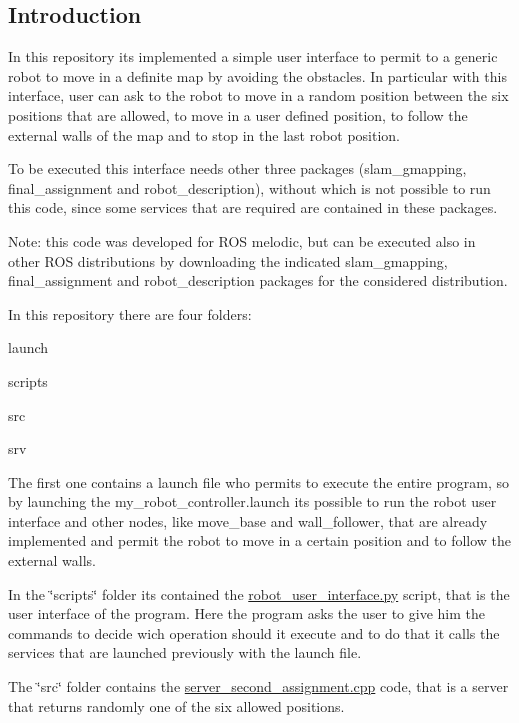 \subsection*{Introduction}

In this repository it\textquotesingle{}s implemented a simple user interface to permit to a generic robot to move in a definite map by avoiding the obstacles. In particular with this interface, user can ask to the robot to move in a random position between the six positions that are allowed, to move in a user defined position, to follow the external walls of the map and to stop in the last robot position.

To be executed this interface needs other three packages (slam\+\_\+gmapping, final\+\_\+assignment and robot\+\_\+description), without which is not possible to run this code, since some services that are required are contained in these packages.

Note\+: this code was developed for R\+OS melodic, but can be executed also in other R\+OS distributions by downloading the indicated slam\+\_\+gmapping, final\+\_\+assignment and robot\+\_\+description packages for the considered distribution.

In this repository there are four folders\+:


\begin{DoxyItemize}
\item launch
\item scripts
\item src
\item srv
\end{DoxyItemize}

The first one contains a launch file who permits to execute the entire program, so by launching the my\+\_\+robot\+\_\+controller.\+launch it\textquotesingle{}s possible to run the robot user interface and other nodes, like move\+\_\+base and wall\+\_\+follower, that are already implemented and permit the robot to move in a certain position and to follow the external walls.

In the \char`\"{}scripts\char`\"{} folder it\textquotesingle{}s contained the \hyperlink{robot__user__interface_8py}{robot\+\_\+user\+\_\+interface.\+py} script, that is the user interface of the program. Here the program asks the user to give him the commands to decide wich operation should it execute and to do that it calls the services that are launched previously with the launch file.

The \char`\"{}src\char`\"{} folder contains the \hyperlink{_server__second__assignment_8cpp}{server\+\_\+second\+\_\+assignment.\+cpp} code, that is a server that returns randomly one of the six allowed positions.


